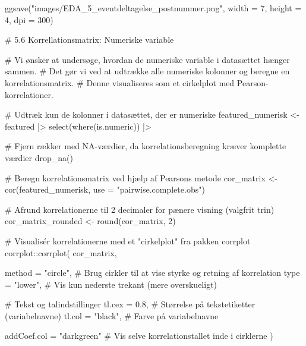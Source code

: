 \documentclass[
  11pt,
  letterpaper,
  DIV=11,
  numbers=noendperiod]{scrartcl}
\newenvironment{Shaded}{\begin{snugshade}}{\end{snugshade}}
\newcommand{\AttributeTok}[1]{\textcolor[rgb]{0.40,0.45,0.13}{#1}}
\newcommand{\CommentTok}[1]{\textcolor[rgb]{0.37,0.37,0.37}{#1}}
\newcommand{\DecValTok}[1]{\textcolor[rgb]{0.68,0.00,0.00}{#1}}
\newcommand{\FloatTok}[1]{\textcolor[rgb]{0.68,0.00,0.00}{#1}}
\newcommand{\FunctionTok}[1]{\textcolor[rgb]{0.28,0.35,0.67}{#1}}
\newcommand{\NormalTok}[1]{\textcolor[rgb]{0.00,0.23,0.31}{#1}}
\newcommand{\OtherTok}[1]{\textcolor[rgb]{0.00,0.23,0.31}{#1}}
\newcommand{\SpecialCharTok}[1]{\textcolor[rgb]{0.37,0.37,0.37}{#1}}
\newcommand{\StringTok}[1]{\textcolor[rgb]{0.13,0.47,0.30}{#1}}
\begin{document}
\begin{Shaded}
\begin{Highlighting}[]
\FunctionTok{ggsave}\NormalTok{(}\StringTok{"images/EDA\_5\_eventdeltagelse\_postnummer.png"}\NormalTok{, }\AttributeTok{width =} \DecValTok{7}\NormalTok{, }\AttributeTok{height =} \DecValTok{4}\NormalTok{, }\AttributeTok{dpi =} \DecValTok{300}\NormalTok{)}

\CommentTok{\# 5.6 Korrellationsmatrix: Numeriske variable}

\CommentTok{\# Vi ønsker at undersøge, hvordan de numeriske variable i datasættet hænger sammen.}
\CommentTok{\# Det gør vi ved at udtrække alle numeriske kolonner og beregne en korrelationsmatrix.}
\CommentTok{\# Denne visualiseres som et cirkelplot med Pearson{-}korrelationer.}

\CommentTok{\# Udtræk kun de kolonner i datasættet, der er numeriske}
\NormalTok{featured\_numerisk }\OtherTok{\textless{}{-}}\NormalTok{ featured }\SpecialCharTok{|\textgreater{}} 
  \FunctionTok{select}\NormalTok{(}\FunctionTok{where}\NormalTok{(is.numeric)) }\SpecialCharTok{|\textgreater{}} 
  
  \CommentTok{\# Fjern rækker med NA{-}værdier, da korrelationsberegning kræver komplette værdier}
  \FunctionTok{drop\_na}\NormalTok{()}

\CommentTok{\# Beregn korrelationsmatrix ved hjælp af Pearson\textquotesingle{}s metode}
\NormalTok{cor\_matrix }\OtherTok{\textless{}{-}} \FunctionTok{cor}\NormalTok{(featured\_numerisk, }\AttributeTok{use =} \StringTok{"pairwise.complete.obs"}\NormalTok{)}

\CommentTok{\# Afrund korrelationerne til 2 decimaler for pænere visning (valgfrit trin)}
\NormalTok{cor\_matrix\_rounded }\OtherTok{\textless{}{-}} \FunctionTok{round}\NormalTok{(cor\_matrix, }\DecValTok{2}\NormalTok{)}

\CommentTok{\# Visualisér korrelationerne med et "cirkelplot" fra pakken \textquotesingle{}corrplot\textquotesingle{}}
\NormalTok{corrplot}\SpecialCharTok{::}\FunctionTok{corrplot}\NormalTok{(}
\NormalTok{  cor\_matrix,}
  
  \AttributeTok{method =} \StringTok{"circle"}\NormalTok{,       }\CommentTok{\# Brug cirkler til at vise styrke og retning af korrelation}
  \AttributeTok{type =} \StringTok{"lower"}\NormalTok{,          }\CommentTok{\# Vis kun nederste trekant (mere overskueligt)}
  
  \CommentTok{\# Tekst og talindstillinger}
  \AttributeTok{tl.cex =} \FloatTok{0.8}\NormalTok{,            }\CommentTok{\# Størrelse på tekstetiketter (variabelnavne)}
  \AttributeTok{tl.col =} \StringTok{"black"}\NormalTok{,        }\CommentTok{\# Farve på variabelnavne}
  
  \AttributeTok{addCoef.col =} \StringTok{"darkgreen"}    \CommentTok{\# Vis selve korrelationstallet inde i cirklerne}
\NormalTok{)}
\end{Highlighting}
\end{Shaded}
\end{document}
